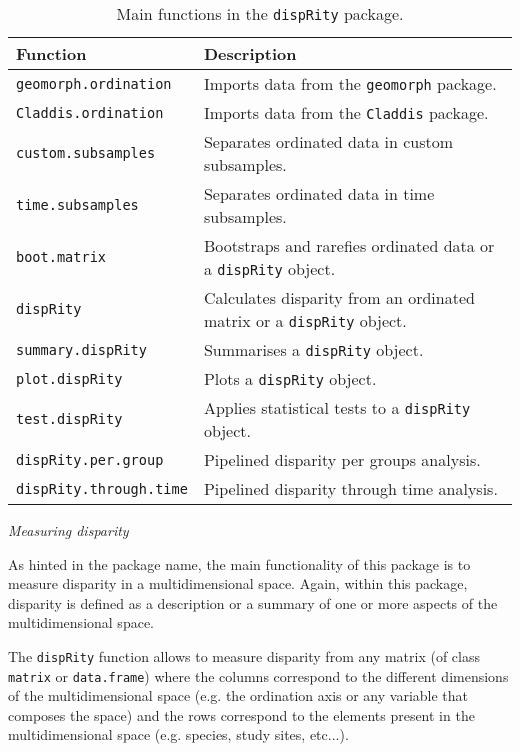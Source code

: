 \documentclass[12pt,letterpaper]{article}
\renewcommand{\subsection}[1]{%
\bigskip
\begin{center}
\begin{large}
\normalfont\itshape #1
\end{large}
\end{center}}
\newcommand{\disp}{\texttt{dispRity} }
\begin{document}
\begin{table}
    \begin{tabular}{ll}
        \hline
        Function & Description \\ 
        \hline
        \texttt{geomorph.ordination} & Imports data from the \texttt{geomorph} package. \\
        \texttt{Claddis.ordination} & Imports data from the \texttt{Claddis} package. \\
        \texttt{custom.subsamples} & Separates ordinated data in custom subsamples. \\
        \texttt{time.subsamples} & Separates ordinated data in time subsamples. \\
        \texttt{boot.matrix} & Bootstraps and rarefies ordinated data or a \disp object. \\
        \disp & Calculates disparity from an ordinated matrix or a \disp object. \\
        \texttt{summary.dispRity} & Summarises a \disp object. \\
        \texttt{plot.dispRity} & Plots a \disp object. \\
        \texttt{test.dispRity} & Applies statistical tests to a \disp object.\\
        \texttt{dispRity.per.group} & Pipelined disparity per groups analysis. \\
        \texttt{dispRity.through.time} & Pipelined disparity through time analysis. \\
        \hline
    \end{tabular}
    \caption{Main functions in the \disp package.}
\end{table}


\subsection{Measuring disparity}
As hinted in the package name, the main functionality of this package is to measure disparity in a multidimensional space.
Again, within this package, disparity is defined as a description or a summary of one or more aspects of the multidimensional space.

The \disp function allows to measure disparity from any matrix (of class \texttt{matrix} or \texttt{data.frame}) where the columns correspond to the different dimensions of the multidimensional space (e.g. the ordination axis or any variable that composes the space) and the rows correspond to the elements present in the multidimensional space (e.g. species, study sites, etc...).
\end{document}
